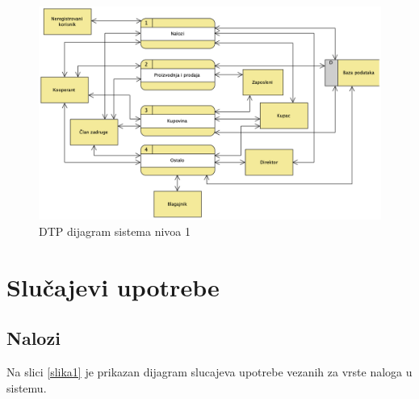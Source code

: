 \documentclass[a4paper, oneside]{article}
\begin{document}
\begin{figure}[h!]
    \centering
    \includegraphics[scale=0.5]{images/dtp_nivo_1.png}
    \caption{DTP dijagram sistema nivoa 1}
    \label{dtp_nivo_1}
\end{figure}

\newpage

\section{Slučajevi upotrebe}

\subsection{Nalozi}
Na slici %
\ref{slika1} je prikazan dijagram slucajeva upotrebe vezanih za vrste naloga u sistemu.


\end{document}
